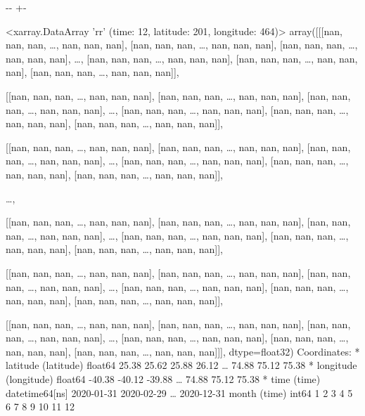 \documentclass[letterpaper,10pt,english]{sphinxmanual}
\newlength\nbsphinxcodecellspacing
\begin{document}
{

\kern-\sphinxverbatimsmallskipamount\kern-\baselineskip
\kern+\FrameHeightAdjust\kern-\fboxrule
\vspace{\nbsphinxcodecellspacing}

\begin{sphinxVerbatim}[commandchars=\\\{\}]
\llap{\color{nbsphinxout}[46]:\,\hspace{\fboxrule}\hspace{\fboxsep}}<xarray.DataArray 'rr' (time: 12, latitude: 201, longitude: 464)>
array([[[nan, nan, nan, {\ldots}, nan, nan, nan],
        [nan, nan, nan, {\ldots}, nan, nan, nan],
        [nan, nan, nan, {\ldots}, nan, nan, nan],
        {\ldots},
        [nan, nan, nan, {\ldots}, nan, nan, nan],
        [nan, nan, nan, {\ldots}, nan, nan, nan],
        [nan, nan, nan, {\ldots}, nan, nan, nan]],

       [[nan, nan, nan, {\ldots}, nan, nan, nan],
        [nan, nan, nan, {\ldots}, nan, nan, nan],
        [nan, nan, nan, {\ldots}, nan, nan, nan],
        {\ldots},
        [nan, nan, nan, {\ldots}, nan, nan, nan],
        [nan, nan, nan, {\ldots}, nan, nan, nan],
        [nan, nan, nan, {\ldots}, nan, nan, nan]],

       [[nan, nan, nan, {\ldots}, nan, nan, nan],
        [nan, nan, nan, {\ldots}, nan, nan, nan],
        [nan, nan, nan, {\ldots}, nan, nan, nan],
        {\ldots},
        [nan, nan, nan, {\ldots}, nan, nan, nan],
        [nan, nan, nan, {\ldots}, nan, nan, nan],
        [nan, nan, nan, {\ldots}, nan, nan, nan]],

       {\ldots},

       [[nan, nan, nan, {\ldots}, nan, nan, nan],
        [nan, nan, nan, {\ldots}, nan, nan, nan],
        [nan, nan, nan, {\ldots}, nan, nan, nan],
        {\ldots},
        [nan, nan, nan, {\ldots}, nan, nan, nan],
        [nan, nan, nan, {\ldots}, nan, nan, nan],
        [nan, nan, nan, {\ldots}, nan, nan, nan]],

       [[nan, nan, nan, {\ldots}, nan, nan, nan],
        [nan, nan, nan, {\ldots}, nan, nan, nan],
        [nan, nan, nan, {\ldots}, nan, nan, nan],
        {\ldots},
        [nan, nan, nan, {\ldots}, nan, nan, nan],
        [nan, nan, nan, {\ldots}, nan, nan, nan],
        [nan, nan, nan, {\ldots}, nan, nan, nan]],

       [[nan, nan, nan, {\ldots}, nan, nan, nan],
        [nan, nan, nan, {\ldots}, nan, nan, nan],
        [nan, nan, nan, {\ldots}, nan, nan, nan],
        {\ldots},
        [nan, nan, nan, {\ldots}, nan, nan, nan],
        [nan, nan, nan, {\ldots}, nan, nan, nan],
        [nan, nan, nan, {\ldots}, nan, nan, nan]]], dtype=float32)
Coordinates:
  * latitude   (latitude) float64 25.38 25.62 25.88 26.12 {\ldots} 74.88 75.12 75.38
  * longitude  (longitude) float64 -40.38 -40.12 -39.88 {\ldots} 74.88 75.12 75.38
  * time       (time) datetime64[ns] 2020-01-31 2020-02-29 {\ldots} 2020-12-31
    month      (time) int64 1 2 3 4 5 6 7 8 9 10 11 12
\end{sphinxVerbatim}
}
\end{document}
